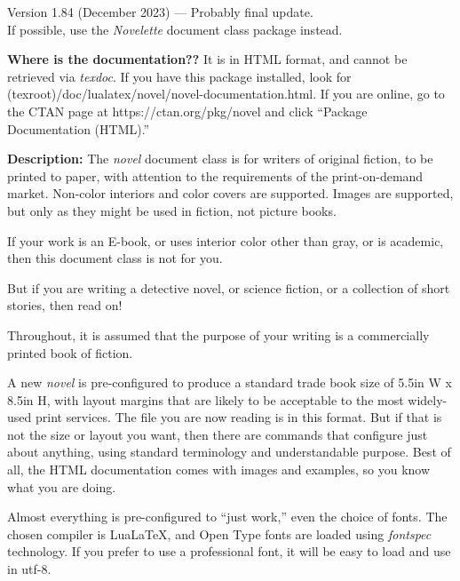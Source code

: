 \documentclass{novel} %
\begin{document}
\begin{ChapterStart}[8]
\vspace{\nbs} %
\vspace{\nbs}
{\centering Version 1.84 (December 2023) --- Probably final update.\\
If possible, use the \emph{Novelette} document class package instead.\par}
\end{ChapterStart}

\textbf{Where is the documentation??} It is in HTML format, and cannot be retrieved via  \textit{texdoc}. If you have this package installed, look for (texroot)/doc/lualatex/novel/novel-documentation.html. If you are online, go to the CTAN page at https://ctan.org/pkg/novel and click ``Package Documentation (HTML).''

\scenebreak

\textbf{Description:} The \emph{novel} document class is for writers of original fiction, to be printed to paper, with attention to the requirements of the print-on-demand market. Non-color interiors and color covers are supported. Images are supported, but only as they might be used in fiction, not picture books.

If your work is an E-book, or uses interior color other than gray, or is academic, then this document class is not for you. 

But if you are writing a detective novel, or science fiction, or a collection of short stories, then read on!


Throughout, it is assumed that the purpose of your writing is a commercially printed book of fiction.

A new \emph{novel} is pre-configured to produce a standard trade book size of 5.5in W x 8.5in H, with layout margins that are likely to be acceptable to the most widely-used print services. The file you are now reading is in this format. But if that is not the size or layout you want, then there are commands that configure just about anything, using standard terminology and understandable purpose. Best of all, the HTML documentation comes with images and examples, so you know what you are doing.

Almost everything is pre-configured to “just work,” even the choice of fonts. The chosen compiler is LuaLaTeX, and Open Type fonts are loaded using \textit{fontspec} technology. If you prefer to use a professional font, it will be easy to load and use in utf-8.
\end{document}
